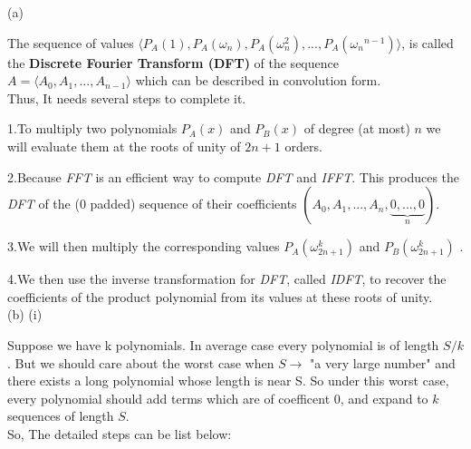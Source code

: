 \documentclass[a4paper,12pt]{article}
\begin{document}
(a)

The sequence of values $\langle P_A(1), P_A(\omega_n), P_A(\omega_n ^2), . . . , P_A({\omega_n} ^ {n - 1})\rangle$, is called the \textbf{Discrete Fourier Transform (DFT)} of the sequence $A = \langle A_0,A_1,...,A_{n-1}\rangle$ which can be described in convolution form.\\
Thus, It needs several steps to complete it.


1.To multiply two polynomials $P_A(x)$ and $P_B(x)$ of degree (at most) $n$ we will evaluate them at the roots of unity of $2n+1$ orders.

2.Because \textit{FFT} is an efficient way to compute \textit{DFT} and \textit{IFFT}. This produces the \textit{DFT} of the (0 padded) sequence of their coefficients $(A_0,A_1,...,A_n,\underbrace{0,...,0}_{\text{$n$}})$. 

3.We will then multiply the corresponding values $P_A(\omega_{2n+1}^{k})$ and $P_B(\omega_{2n+1}^{k})$ . 

4.We then use the inverse transformation for \textit{DFT}, called \textit{IDFT}, to recover the coefficients of the product polynomial from its values at these roots of unity. \\


(b) (i) 

Suppose we have k polynomials. In average case every polynomial is of length $S/k$. But we should care about the worst case when $S \rightarrow $ "a very large number" and there exists a long polynomial whose length is near S. So under this worst case, every polynomial should add terms which are of coefficent 0, and expand to $k$ sequences of length $S$.\\
So, The detailed steps can be list below:
\end{document}
